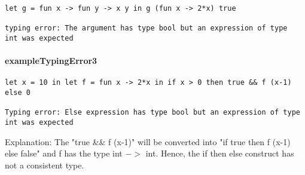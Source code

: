 \documentclass[a4paper, 12pt, titlepage]{article}
\begin{document}
\begin{verbatim}
let g = fun x -> fun y -> x y in g (fun x -> 2*x) true

typing error: The argument has type bool but an expression of type 
int was expected
\end{verbatim}

\paragraph{exampleTypingError3}
\begin{verbatim}
let x = 10 in let f = fun x -> 2*x in if x > 0 then true && f (x-1) else 0

Typing error: Else expression has type bool but an expression of type 
int was expected
\end{verbatim}

Explanation: The "true \&\& f (x-1)" will be converted into "if true then f (x-1) else false" and f has the type int $->$ int. Hence, the if then else construct has not a consistent type.
\end{document}
